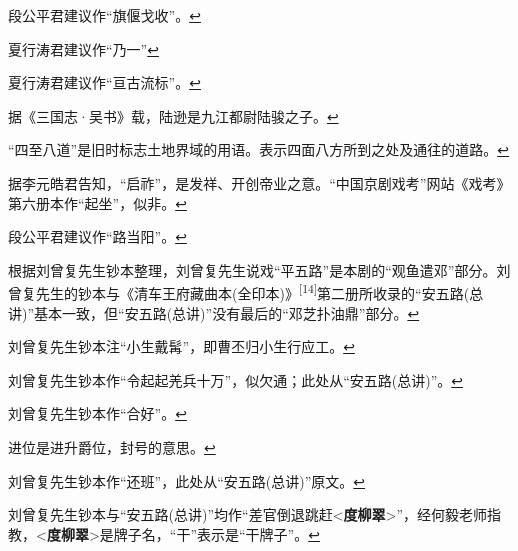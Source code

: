 \item
  \leavevmode\hypertarget{fn214}{}%
  段公平君建议作``旗偃戈收''。\protect\hyperlink{fnref214}{↩}
\item
  \leavevmode\hypertarget{fn215}{}%
  夏行涛君建议作``乃一''\protect\hyperlink{fnref215}{↩}
\item
  \leavevmode\hypertarget{fn216}{}%
  夏行涛君建议作``亘古流标''。\protect\hyperlink{fnref216}{↩}
\item
  \leavevmode\hypertarget{fn217}{}%
  据《三国志·吴书》载，陆逊是九江都尉陆骏之子。\protect\hyperlink{fnref217}{↩}
\item
  \leavevmode\hypertarget{fn218}{}%
  ``四至八道''是旧时标志土地界域的用语。表示四面八方所到之处及通往的道路。\protect\hyperlink{fnref218}{↩}
\item
  \leavevmode\hypertarget{fn219}{}%
  据李元皓君告知，``启祚''，是发祥、开创帝业之意。``中国京剧戏考''网站《戏考》第六册本作``起坐''，似非。\protect\hyperlink{fnref219}{↩}
\item
  \leavevmode\hypertarget{fn220}{}%
  段公平君建议作``路当阳''。\protect\hyperlink{fnref220}{↩}
\item
  \leavevmode\hypertarget{fn221}{}%
  根据刘曾复先生钞本整理，刘曾复先生说戏``平五路''是本剧的``观鱼遣邓''部分。刘曾复先生的钞本与《清车王府藏曲本(全印本)》\textsuperscript{{[}14{]}}第二册所收录的``安五路(总讲)''基本一致，但``安五路(总讲)''没有最后的``邓芝扑油鼎''部分。\protect\hyperlink{fnref221}{↩}
\item
  \leavevmode\hypertarget{fn222}{}%
  刘曾复先生钞本注``小生戴髯''，即曹丕归小生行应工。\protect\hyperlink{fnref222}{↩}
\item
  \leavevmode\hypertarget{fn223}{}%
  刘曾复先生钞本作``令起起羌兵十万''，似欠通；此处从``安五路(总讲)''。\protect\hyperlink{fnref223}{↩}
\item
  \leavevmode\hypertarget{fn224}{}%
  刘曾复先生钞本作``合好''。\protect\hyperlink{fnref224}{↩}
\item
  \leavevmode\hypertarget{fn225}{}%
  进位是进升爵位，封号的意思。\protect\hyperlink{fnref225}{↩}
\item
  \leavevmode\hypertarget{fn226}{}%
  刘曾复先生钞本作``还班''，此处从``安五路(总讲)''原文。\protect\hyperlink{fnref226}{↩}
\item
  \leavevmode\hypertarget{fn227}{}%
  刘曾复先生钞本与``安五路(总讲)''均作``差官倒退跳赶\textless{}\textbf{度柳翠}\textgreater{}''，经何毅老师指教，\textless{}\textbf{度柳翠}\textgreater{}是牌子名，``干''表示是``干牌子''。\protect\hyperlink{fnref227}{↩}
\item
